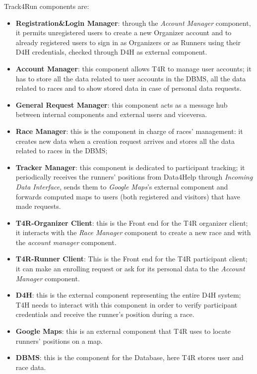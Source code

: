 Track4Run components are:
\begin{itemize}
    \item \textbf{Registration\&Login Manager}: through the \emph{Account Manager}  component, it permits unregistered users to create a new Organizer account and to already registered users to sign in as Organizers or as Runners using their D4H credentials, checked through D4H as external component.
    \item \textbf{Account Manager}: this component allows T4R to manage user accounts; it has to store all the data related to user accounts in the DBMS, all the data related to races and to show stored data in case of personal data requests.
    \item \textbf{General Request Manager}: this component acts as a message hub between internal components and external users and viceversa.
    \item \textbf{Race Manager}: this is the component in charge of races' management: it creates new data when a creation request arrives and stores all the data related to races in the DBMS;
    \item \textbf{Tracker Manager}: this component is dedicated to participant tracking; it periodically receives the runners' positions from Data4Help through \emph{Incoming Data Interface}, sends them to \emph{Google Maps}'s external component and forwards computed maps to users (both registered and visitors) that have made requests.
    \item \textbf{T4R-Organizer Client}: this is the Front end for the T4R organizer client; it interacts with the \emph{Race Manager} component to create a new race and with the \emph{account manager} component.
    \item \textbf{T4R-Runner Client}: This is the Front end for the T4R participant client; it can make an enrolling request or ask for its personal data to the \emph{Account Manager} component.
    \item \textbf{D4H}: this is the external component representing the entire D4H system; T4H needs to interact with this component in order to verify participant credentials and receive the runner's position during a race.
    \item \textbf{Google Maps}: this is an external component that T4R uses to locate runners' positions on a map.
    \item \textbf{DBMS}: this is the component for the Database, here T4R stores user and race data.
\end{itemize}